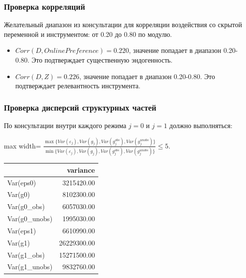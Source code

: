 \documentclass[11pt]{article}
\newcounter{none}
\providecommand{\tightlist}{%
      \setlength{\itemsep}{0pt}\setlength{\parskip}{0pt}}
\begin{document}
\subsubsection{Проверка
корреляций}\label{ux43fux440ux43eux432ux435ux440ux43aux430-ux43aux43eux440ux440ux435ux43bux44fux446ux438ux439}

Желательный диапазон из консультации для корреляции воздействия со
скрытой переменной и инструментом: от 0.20 до 0.80 по модулю.

\begin{itemize}
\tightlist
\item
  \(Corr(D, OnlinePreference) = 0.220\), значение попадает в диапазон
  0.20-0.80. Это подтверждает существенную эндогенность.
\item
  \(Corr(D, Z) = 0.226\), значение попадает в диапазон 0.20-0.80. Это
  подтверждает релевантность инструмента.
\end{itemize}

\subsubsection{Проверка дисперсий структурных
частей}\label{ux43fux440ux43eux432ux435ux440ux43aux430-ux434ux438ux441ux43fux435ux440ux441ux438ux439-ux441ux442ux440ux443ux43aux442ux443ux440ux43dux44bux445-ux447ux430ux441ux442ux435ux439}

По консультации внутри каждого режима \(j = 0\) и \(j = 1\) должно
выполняться:

\begin{center}
\begin{adjustbox}{max width=\linewidth}
\(\displaystyle \frac{\max\{Var(\varepsilon_j), Var(g_j), Var(g_j^{obs}), Var(g_j^{unobs})\}}{\min\{Var(\varepsilon_j), Var(g_j), Var(g_j^{obs}), Var(g_j^{unobs})\}} \leq 5.\)
\end{adjustbox}
\end{center}

{\def\LTcaptype{none} %
\begin{longtable}[]{@{}lr@{}}
\toprule\noalign{}
& variance \\
\midrule\noalign{}
\endhead
\bottomrule\noalign{}
\endlastfoot
Var(eps0) & 3215420.00 \\
Var(g0) & 8102300.00 \\
Var(g0\_obs) & 6057030.00 \\
Var(g0\_unobs) & 1995030.00 \\
Var(eps1) & 6610990.00 \\
Var(g1) & 26229300.00 \\
Var(g1\_obs) & 15271500.00 \\
Var(g1\_unobs) & 9832760.00 \\
\end{longtable}
}
\end{document}
